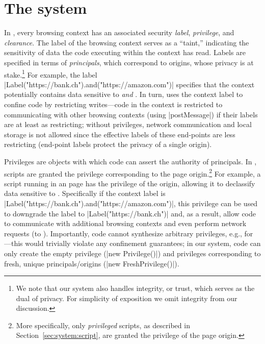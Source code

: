\section{The \sys{} system}
\label{sec:system}

In \sys, every browsing context has an associated security \emph{label},
\emph{privilege}, and \emph{clearance}.
%
The label of the browsing context serves as a ``taint,'' indicating
the sensitivity of data the code executing within the context has
read.
%
Labels are specified in terms of \emph{principals}, which
correspond to origins, whose privacy is at stake.\footnote{
  We note that our system also handles integrity, or trust, which
  serves as the dual of privacy.
  For simplicity of exposition we omit integrity from our discussion.
}
%
For example, the label
\js|Label("https://bank.ch").and("https://amazon.com")| specifies that
the context potentially contains data sensitive to 
\emph{and} .
%
In turn, \sys{} uses the context label to confine code by restricting
writes---code in the context is restricted to communicating with other
browsing contexts (using \js|postMessage|) if their labels are at
least as restricting; without privileges, network communication and
local storage is not allowed since the effective labels of these
end-points are less restricting (end-point labels protect the privacy
of a single origin).

Privileges are objects with which code can assert the authority of
principals. 
%
In \sys, scripts are granted the privilege corresponding to the
page origin.\footnote{
More specifically, only \emph{privileged} scripts, as described in
Section~\ref{sec:system:script}, are granted the privilege of the page
origin.
}
For example, a script running in an  page has the
privilege of the origin, allowing it to declassify data sensitive to
.
%
Specifically if the context label is
\js|Label("https://bank.ch").and("https://amazon.com")|, this privilege
can be used to downgrade the label to \js|Label("https://bank.ch")|
and, as a result, allow code to communicate with additional browsing
contexts and even perform network requests (to ).
%
Importantly, code cannot synthesize arbitrary privileges, e.g., for
---this would trivially violate any confinement
guarantees;
%
in our system, code can only create the empty privilege
(\js|new Privilege()|) 
and privileges corresponding to fresh, unique principals/origins
(\js|new FreshPrivilege()|).

